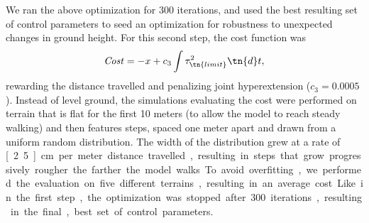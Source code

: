 We ran the above optimization for 300 iterations, and used the best resulting set
of control parameters to seed an optimization for robustness to unexpected
changes in ground height. For this second step, the cost function was
\begin{align}
    \mathit{Cost} = -x + c_3 \int \tau_\tn{limit}^2 \tn{d}t,
\end{align}
rewarding the distance travelled and penalizing joint hyperextension ($c_3 =
0.0005$). Instead of level ground, the simulations evaluating the cost were
performed on terrain that is flat for the first 10 meters (to allow the model to
reach steady walking) and then features steps, spaced one meter apart and drawn
from a uniform random distribution. The width of the distribution grew at a rate
of \unit[2.5]{cm} per meter distance travelled, resulting in steps that grow
progressively rougher the farther the model walks. To avoid overfitting, we
performed the evaluation on five different terrains, resulting in an average
cost. Like in the first step, the optimization was stopped after 300 iterations,
resulting in the final, best set of control parameters.
